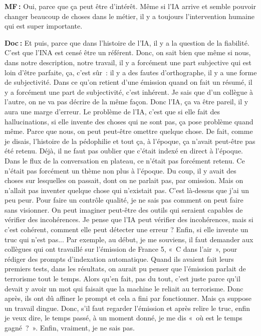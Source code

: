 \textbf{MF :} Oui, parce que ça peut être d'intérêt. Même si l'IA arrive et semble pouvoir changer beaucoup de choses dans le métier, il y a toujours l'intervention humaine qui est super importante. 

\textbf{Doc :} Et puis, parce que dans l'histoire de l'IA, il y a la question de la fiabilité. C'est que l'INA est censé être un référent. Donc, on sait bien que même si nous, dans notre description, notre travail, il y a forcément une part subjective qui est loin d'être parfaite, ça, c'est sûr : il y a des fautes d'orthographe, il y a une forme de subjectivité. Dans ce qu'on retient d'une émission quand on fait un résumé, il y a forcément une part de subjectivité, c'est inhérent. Je sais que d'un collègue à l'autre, on ne va pas décrire de la même façon. Donc l'IA, ça va être pareil, il y aura une marge d’erreur. Le problème de l'IA, c'est que si elle fait des hallucinations, si elle invente des choses qui ne sont pas, ça pose problème quand même. Parce que nous, on peut peut-être omettre quelque chose. De fait, comme je disais, l'histoire de la pédophilie et tout ça, à l'époque, ça n'avait peut-être pas été retenu. Déjà, il ne faut pas oublier que c'était indexé en direct à l'époque. Dans le flux de la conversation en plateau, ce n'était pas forcément retenu. Ce n'était pas forcément un thème non plus à l'époque. Du coup, il y avait des choses sur lesquelles on passait, dont on ne parlait pas, par omission. Mais on n'allait pas inventer quelque chose qui n'existait pas. C'est là-dessus que j'ai un peu peur. Pour faire un contrôle qualité, je ne sais pas comment on peut faire sans visionner. On peut imaginer peut-être des outils qui seraient capables de vérifier des incohérences.  Je pense que l'IA peut vérifier des incohérences, mais si c'est cohérent, comment elle peut détecter une erreur ? Enfin, si elle invente un truc qui n'est pas...  Par exemple, au début, je me souviens, il faut demander aux collègues qui ont travaillé sur l'émission de France 5, « C dans l’air », pour rédiger des prompts d’indexation automatique. Quand ils avaient fait leurs premiers tests, dans les résultats, on aurait pu penser que l’émission parlait de terrorisme tout le temps. Alors qu'en fait, pas du tout, c'est juste parce qu'il devait y avoir un mot qui faisait que la machine le reliait au terrorisme. Donc après, ils ont dû affiner le prompt et cela a fini par fonctionner. Mais ça suppose un travail dingue. Donc, s'il faut regarder l'émission et après relire le truc, enfin je veux dire, le temps passé, à un moment donné, je me dis « où est le temps gagné ? ».  Enfin, vraiment, je ne sais pas.


